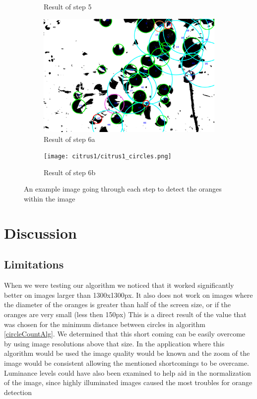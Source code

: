 \documentclass[conference]{IEEEtran}
\begin{document}
\begin{figure}[H]
\begin{subfigure}{.3\linewidth}
    \caption{Result of step 5}
  \end{subfigure}\par\medskip
  \begin{subfigure}{.49\linewidth}
    \includegraphics[width=\linewidth]{citrus1/citrus1_circles_mask.png}\hfill
      \caption{Result of step 6a}
  \end{subfigure}
  \begin{subfigure}{.49\linewidth}
    \texttt{[image: citrus1/citrus1\_circles.png]}\hfill
   \caption{Result of step 6b}
  \end{subfigure}
  \caption{An example image going through each step to detect the oranges within the image} \label{fig:stages}
\end{figure}


\section{Discussion}

\subsection{Limitations} \label{sec:limitations}


When we were testing our algorithm we noticed that it worked significantly better on images larger than 1300x1300px. It also does not work on images where the diameter of the oranges is greater than half of the screen size, or if the oranges are very small (less then 150px) This is a direct result of the value that was chosen for the minimum distance between circles in algorithm \ref{circleCountAlg}. We determined that this short coming can be easily overcome by using image resolutions above that size. In the application where this algorithm would be used the image quality would be known and the zoom of the image would be consistent allowing the mentioned shortcomings to be overcame.  Luminance levels could have also been examined to help aid in the normalization of the image, since highly illuminated images caused the most troubles for orange detection
\end{document}
